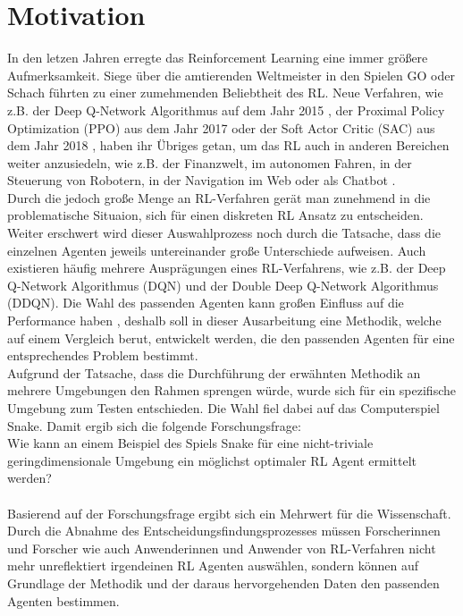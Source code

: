 \section{Motivation}
In den letzen Jahren erregte das Reinforcement Learning eine immer größere Aufmerksamkeit. Siege über die amtierenden Weltmeister in den Spielen GO oder Schach führten zu einer zumehmenden Beliebtheit des RL. Neue Verfahren, wie z.B. der Deep Q-Network Algorithmus auf dem Jahr 2015 \cite{DQN}, der Proximal Policy Optimization (PPO) aus dem Jahr 2017 \cite{PPO} oder der Soft Actor Critic (SAC) aus dem Jahr 2018 \cite{SAC}, haben ihr Übriges getan, um das RL auch in anderen Bereichen weiter anzusiedeln, wie z.B. der Finanzwelt, im autonomen Fahren, in der Steuerung von Robotern, in der Navigation im Web oder als Chatbot \cite{DRL}.\\
Durch die jedoch große Menge an RL-Verfahren gerät man zunehmend in die problematische Situaion, sich für einen diskreten RL Ansatz zu entscheiden. Weiter erschwert wird dieser Auswahlprozess noch durch die Tatsache, dass die einzelnen Agenten jeweils untereinander große Unterschiede aufweisen. Auch existieren häufig mehrere Ausprägungen eines RL-Verfahrens, wie z.B. der Deep Q-Network Algorithmus (DQN) und der Double Deep Q-Network Algorithmus (DDQN). Die Wahl des passenden Agenten kann großen Einfluss auf die Performance haben \cite{SnakeRL2016}, deshalb soll in dieser Ausarbeitung eine Methodik, welche auf einem Vergleich berut, entwickelt werden, die den passenden Agenten für eine entsprechendes Problem bestimmt.\\
Aufgrund der Tatsache, dass die Durchführung der erwähnten Methodik an mehrere Umgebungen den Rahmen sprengen würde, wurde sich für ein spezifische Umgebung zum Testen entschieden. Die Wahl fiel dabei auf das Computerspiel Snake.
Damit ergib sich die folgende Forschungsfrage:\\
Wie kann an einem Beispiel des Spiels Snake für eine nicht-triviale geringdimensionale Umgebung ein möglichst optimaler RL Agent ermittelt werden?\\
\\Basierend auf der Forschungsfrage ergibt sich ein Mehrwert für die Wissenschaft. Durch die Abnahme des Entscheidungsfindungsprozesses müssen Forscherinnen und Forscher wie auch Anwenderinnen und Anwender von RL-Verfahren nicht mehr unreflektiert irgendeinen RL Agenten auswählen, sondern können auf Grundlage der Methodik und der daraus hervorgehenden Daten den passenden Agenten bestimmen.\\
